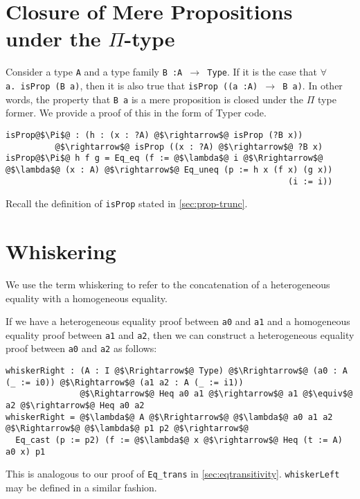 \documentclass[12pt,twoside,maitrise]{dms}
\theoremstyle{definition}
\numberwithin{equation}{section}
\numberwithin{table}{chapter}
\numberwithin{figure}{chapter}
\newcommand\id[1] {\texttt{#1}}
\newcommand\fn[1] {\texttt{#1}}
\begin{document}
\section{Closure of Mere Propositions under the $\Pi$-type}\label{app:closure-mp-pi}

Consider a type \id{A} and a type family \fn{B :\@ A $\rightarrow$ Type}.
If it is the case that \fn{$\forall$ a.\ isProp (B a)}, then it is also true that
\fn{isProp ((a :\@ A) $\rightarrow$ B a)}. In other words, the property that \fn{B
  a} is a mere proposition is closed under the $\Pi$ type former. We provide a proof of this in the form of Typer code.

\begin{verbatim}
isProp@$\Pi$@ : (h : (x : ?A) @$\rightarrow$@ isProp (?B x))
          @$\rightarrow$@ isProp ((x : ?A) @$\rightarrow$@ ?B x)
isProp@$\Pi$@ h f g = Eq_eq (f := @$\lambda$@ i @$\Rrightarrow$@ @$\lambda$@ (x : A) @$\rightarrow$@ Eq_uneq (p := h x (f x) (g x))
                                                         (i := i))
\end{verbatim}

Recall the definition of \id{isProp} stated in \autoref{sec:prop-trunc}.

\section{Whiskering}\label{app:whiskering}

We use the term whiskering to refer to the concatenation of a heterogeneous
equality with a homogeneous equality.

If we have a heterogeneous equality proof between \id{a0} and \id{a1} and a
homogeneous equality proof between \id{a1} and \id{a2}, then we can construct a
heterogeneous equality proof between \id{a0} and \id{a2} as follows:

\begin{verbatim}
whiskerRight : (A : I @$\Rrightarrow$@ Type) @$\Rrightarrow$@ (a0 : A (_ := i0)) @$\Rightarrow$@ (a1 a2 : A (_ := i1))
               @$\Rightarrow$@ Heq a0 a1 @$\rightarrow$@ a1 @$\equiv$@ a2 @$\rightarrow$@ Heq a0 a2
whiskerRight = @$\lambda$@ A @$\Rrightarrow$@ @$\lambda$@ a0 a1 a2 @$\Rightarrow$@ @$\lambda$@ p1 p2 @$\rightarrow$@
  Eq_cast (p := p2) (f := @$\lambda$@ x @$\rightarrow$@ Heq (t := A) a0 x) p1
\end{verbatim}


This is analogous to our proof of \id{Eq\_trans} in
\autoref{sec:eqtransitivity}. \id{whiskerLeft} may be defined in a similar
fashion.
\end{document}
